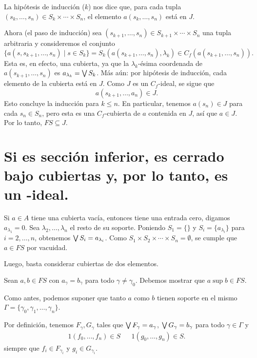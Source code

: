 La hipótesis de inducción ($k$) nos dice que, para cada tupla
$(s_k,\dots,s_n)\in S_k\times\cdots\times S_n$,
el elemento $a(s_k,\dots,s_n)$ está en $J$.

Ahora (el paso de inducción)
sea $(s_{k+1},\dots,s_n)\in S_{k+1}\times\cdots\times S_n$
una tupla arbitraria y consideremos el conjunto
\[
  \{a(s,s_{k+1},\dots,s_n) \mid s\in S_k\}
  =
  S_k(a(s_{k+1},\dots,s_n),\lambda_k)
  \in
  C_f(a(s_{k+1},\dots,s_n))
.\]
Esta es, en efecto, una cubierta, ya que la $\lambda_k$-ésima
coordenada de $a(s_{k+1},\dots,s_n)$ es $a_{\lambda_k}=\bigvee S_k$.
Más aún: por hipótesis de inducción, cada elemento
de la cubierta está en $J$.
Como $J$ es un $C_f$-ideal, se sigue que
\[
  a(s_{k+1},\dots,a_n) \in J
.\]
Esto concluye la inducción para $k\leq n$.
En particular, tenemos $a(s_n)\in J$ para cada $s_n\in S_n$,
pero esta es una $C_f$-cubierta de $a$ contenida en $J$,
así que $a\in J$.
Por lo tanto, $FS\subseteq J$.

\section{Si  es sección inferior,  es cerrado bajo
cubiertas y, por lo tanto, es un -ideal.}

Si $a\in A$ tiene una cubierta vacía, entonces tiene una entrada
cero, digamos $a_{\lambda_1}=0$.
Sea $\lambda_2,\dots,\lambda_n$ el resto de su soporte.
Poniendo $S_1=\{\}$ y $S_i=\{a_{\lambda_i}\}$ para $i=2,\dots,n$,
obtenemos $\bigvee S_i = a_{\lambda_i}$.
Como $S_1\times S_2\times\cdots\times S_n=\emptyset$,
se cumple que $a\in FS$ por vacuidad.

Luego, basta considerar cubiertas de dos elementos.

Sean $a,b\in FS$ con $a_\gamma=b_\gamma$ para todo
$\gamma\neq\gamma_0$.
Debemos mostrar que $a\sup b\in FS$.

Como antes, podemos suponer que tanto $a$ como $b$ tienen soporte
en el mismo $\Gamma=\{\gamma_0,\gamma_1,\dots,\gamma_n\}$.

Por definición, tenemos $F_\gamma,G_\gamma$ tales que $\bigvee
F_\gamma = a_\gamma$, $\bigvee G_\gamma = b_\gamma$ para todo
$\gamma\in\Gamma$ y
\begin{align*}
  1(f_0,\dots,f_n)\in S && 1(g_0,\dots,g_n)\in S.
\end{align*}
siempre que $f_i\in F_{\gamma_i}$ y $g_i\in G_{\gamma_i}$.


